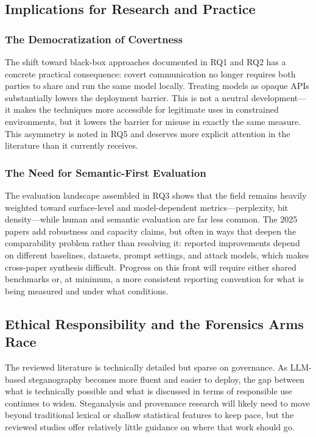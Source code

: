 \subsection{Implications for Research and Practice}

\subsubsection{The Democratization of Covertness}

The shift toward black-box approaches documented in RQ1 and RQ2 has a concrete practical consequence: covert communication no longer requires both parties to share and run the same model locally. Treating models as opaque APIs substantially lowers the deployment barrier. This is not a neutral development---it makes the techniques more accessible for legitimate uses in constrained environments, but it lowers the barrier for misuse in exactly the same measure. This asymmetry is noted in RQ5 and deserves more explicit attention in the literature than it currently receives.

\subsubsection{The Need for Semantic-First Evaluation}

The evaluation landscape assembled in RQ3 shows that the field remains heavily weighted toward surface-level and model-dependent metrics---perplexity, bit density---while human and semantic evaluation are far less common. The 2025 papers add robustness and capacity claims, but often in ways that deepen the comparability problem rather than resolving it: reported improvements depend on different baselines, datasets, prompt settings, and attack models, which makes cross-paper synthesis difficult. Progress on this front will require either shared benchmarks or, at minimum, a more consistent reporting convention for what is being measured and under what conditions.

\subsection{Ethical Responsibility and the Forensics Arms Race}

The reviewed literature is technically detailed but sparse on governance. As LLM-based steganography becomes more fluent and easier to deploy, the gap between what is technically possible and what is discussed in terms of responsible use continues to widen. Steganalysis and provenance research will likely need to move beyond traditional lexical or shallow statistical features to keep pace, but the reviewed studies offer relatively little guidance on where that work should go.

